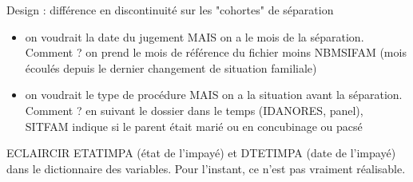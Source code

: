 \documentclass[11pt,a4paper]{article}
\begin{document}
Design : différence en discontinuité sur les "cohortes" de séparation
\begin{itemize}
    \item on voudrait la date du jugement MAIS on a le mois de la séparation. Comment ? on prend le
    mois de référence du fichier moins NBMSIFAM (mois écoulés depuis 
    le dernier changement de situation familiale)
    \item on voudrait le type de procédure MAIS on a la situation avant la séparation. Comment ?
     en suivant le dossier dans le temps (IDANORES, panel), 
    SITFAM indique si le parent était marié ou en concubinage ou pacsé
\end{itemize}


ECLAIRCIR ETATIMPA (état de l'impayé) et DTETIMPA (date de l'impayé) dans le dictionnaire
des variables.
Pour l'instant, ce n'est pas vraiment réalisable.
\end{document}

